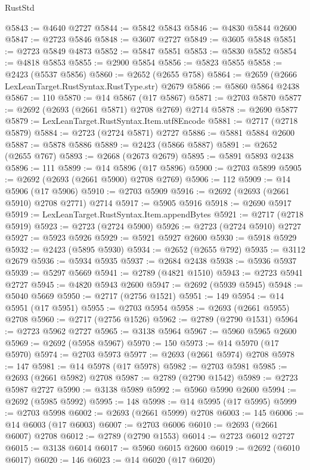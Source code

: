 \begin{lexlean}{RustStd}
\begin{coremodule}
@5843 := @4640 @2727
@5844 := @5842 @5843
@5846 := @4830 @5844 @2600
@5847 := @2723 @5846
@5848 := @3607 @2727
@5849 := @3605 @5848
@5851 := @2723 @5849 @4873
@5852 := @5847 @5851
@5853 := @5830 @5852
@5854 := @4818 @5853
@5855 := @2900 @5854
@5856 := @5823 @5855
@5858 := @2423 (@5537 @5856)
@5860 := @2652 (@2655 @758)
@5864 := @2659 (@2666 LexLeanTarget.RustSyntax.RustType.str) @2679
@5866 := @5860 @5864 @2438
@5867 := 110
@5870 := @14 @5867 (@17 @5867)
@5871 := @2703 @5870
@5877 := @2692 (@2693 (@2661 @5871) @2708 @2769) @2714
@5878 := @2690 @5877
@5879 := LexLeanTarget.RustSyntax.Item.utf8Encode
@5881 := @2717 (@2718 @5879)
@5884 := @2723 (@2724 @5871) @2727
@5886 := @5881 @5884 @2600
@5887 := @5878 @5886
@5889 := @2423 (@5866 @5887)
@5891 := @2652 (@2655 @767)
@5893 := @2668 (@2673 @2679)
@5895 := @5891 @5893 @2438
@5896 := 111
@5899 := @14 @5896 (@17 @5896)
@5900 := @2703 @5899
@5905 := @2692 (@2693 (@2661 @5900) @2708 @2769)
@5906 := 112
@5909 := @14 @5906 (@17 @5906)
@5910 := @2703 @5909
@5916 := @2692 (@2693 (@2661 @5910) @2708 @2771) @2714
@5917 := @5905 @5916
@5918 := @2690 @5917
@5919 := LexLeanTarget.RustSyntax.Item.appendBytes
@5921 := @2717 (@2718 @5919)
@5923 := @2723 (@2724 @5900)
@5926 := @2723 (@2724 @5910) @2727
@5927 := @5923 @5926
@5929 := @5921 @5927 @2600
@5930 := @5918 @5929
@5932 := @2423 (@5895 @5930)
@5934 := @2652 (@2655 @792)
@5935 := @3112 @2679
@5936 := @5934 @5935
@5937 := @2684 @2438
@5938 := @5936 @5937
@5939 := @5297 @5669
@5941 := @2789 (@4821 @1510)
@5943 := @2723 @5941 @2727
@5945 := @4820 @5943 @2600
@5947 := @2692 (@5939 @5945)
@5948 := @5040 @5669
@5950 := @2717 (@2756 @1521)
@5951 := 149
@5954 := @14 @5951 (@17 @5951)
@5955 := @2703 @5954
@5958 := @2693 (@2661 @5955) @2708
@5960 := @2717 (@2756 @1526)
@5962 := @2789 (@2790 @1531)
@5964 := @2723 @5962 @2727
@5965 := @3138 @5964
@5967 := @5960 @5965 @2600
@5969 := @2692 (@5958 @5967)
@5970 := 150
@5973 := @14 @5970 (@17 @5970)
@5974 := @2703 @5973
@5977 := @2693 (@2661 @5974) @2708
@5978 := 147
@5981 := @14 @5978 (@17 @5978)
@5982 := @2703 @5981
@5985 := @2693 (@2661 @5982) @2708
@5987 := @2789 (@2790 @1542)
@5989 := @2723 @5987 @2727
@5990 := @3138 @5989
@5992 := @5960 @5990 @2600
@5994 := @2692 (@5985 @5992)
@5995 := 148
@5998 := @14 @5995 (@17 @5995)
@5999 := @2703 @5998
@6002 := @2693 (@2661 @5999) @2708
@6003 := 145
@6006 := @14 @6003 (@17 @6003)
@6007 := @2703 @6006
@6010 := @2693 (@2661 @6007) @2708
@6012 := @2789 (@2790 @1553)
@6014 := @2723 @6012 @2727
@6015 := @3138 @6014
@6017 := @5960 @6015 @2600
@6019 := @2692 (@6010 @6017)
@6020 := 146
@6023 := @14 @6020 (@17 @6020)

\end{coremodule}
\end{lexlean}
